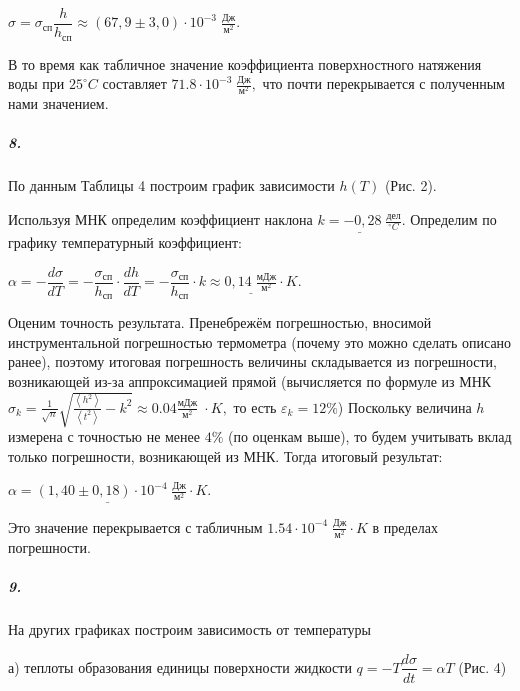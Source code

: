\documentclass[a4paper, 12pt]{article}
\begin{document}
\bigskip

$
\sigma = \sigma_{\text{сп}}\dfrac{h}{h_{\text{сп}}} \approx (67,9 \pm 3,0)\cdot 10^{-3} \; \frac{\text{Дж}}{\text{м}^2}.
$

\bigskip

В то время как табличное значение коэффициента поверхностного натяжения воды при $25^\circ C$ составляет $71.8 \cdot 10^{-3} \; \frac{\text{Дж}}{\text{м}^2}, $ что почти перекрывается с полученным нами значением. 

\subparagraph*{8.}По данным Таблицы 4 построим график зависимости  $h(T)$ (Рис. 2).


Используя МНК определим коэффициент наклона $\underline{k = -0,28 \; \frac{\text{дел}}{^\circ C}}$. 
Определим по графику температурный коэффициент:

\begin{center}
    $\alpha = - \dfrac{d\sigma}{dT} = -\dfrac{\sigma_{\text{сп}}}{h_{\text{сп}}}\cdot \dfrac{d h}{d T} = -\dfrac{\sigma_{\text{сп}}}{h_{\text{сп}}}\cdot k \approx \underline{0,14 \; \frac{\text{мДж}}{\text{м}^2}} \cdot K$. 
\end{center}  
 
Оценим точность результата. Пренебрежём погрешностью, вносимой инструментальной погрешностью термометра (почему это можно сделать описано ранее), поэтому итоговая погрешность величины складывается из погрешности, возникающей из-за аппроксимацией прямой (вычисляется по формуле из МНК $\sigma_k = \frac{1}{\sqrt{n}}\sqrt{\frac{\left< h^2\right>}{\left< t^2\right>} - k^2} \approx 0.04 \frac{\text{мДж}}{\text{м}^2} \; \cdot K,$  то есть $\varepsilon_k =  12 \%$) Поскольку величина $h$ измерена с точностью не менее $4\%$ (по оценкам выше), то будем учитывать вклад только погрешности, возникающей из МНК. Тогда итоговый результат:


\begin{center}
    $
    \underline{\alpha = ( 1,40 \pm 0,18)  \cdot 10^{-4} \; \frac{\text{Дж}}{\text{м}^2} \cdot K}.
    $
\end{center}

Это значение перекрывается с табличным $1.54 \cdot 10^{-4} \; \frac{\text{Дж}}{\text{м}^2} \cdot K$ в пределах погрешности. 

\subparagraph*{9.}На других графиках построим зависимость от температуры 


а) теплоты образования единицы поверхности жидкости $q=-T\dfrac{d\sigma}{dt} = \alpha T$ (Рис. 4) 
\end{document}
